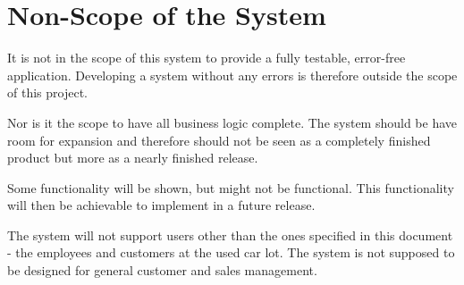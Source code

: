 \section{Non-Scope of the System}
It is not in the scope of this system to provide a fully testable, error-free application. Developing a system without any errors is therefore outside the scope of this project. 

Nor is it the scope to have all business logic complete. The system should be have room for expansion and therefore should not be seen as a completely finished product but more as a nearly finished release. 

Some functionality will be shown, but might not be functional. This functionality will then be achievable to implement in a future release.

The system will not support users other than the ones specified in this document - the employees and customers at the used car lot. The system is not supposed to be designed for general customer and sales management.